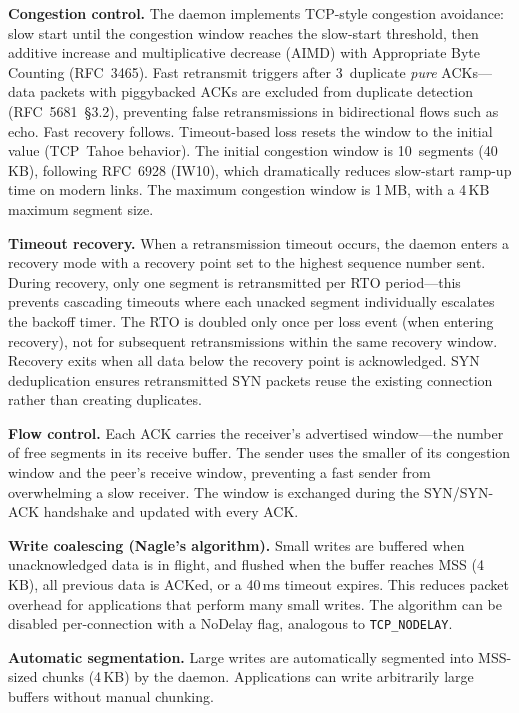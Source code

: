 \documentclass[11pt,a4paper]{article}
\begin{document}
\textbf{Congestion control.} The daemon implements TCP-style congestion avoidance: slow start until the congestion window reaches the slow-start threshold, then additive increase and multiplicative decrease (AIMD) with Appropriate Byte Counting (RFC~3465). Fast retransmit triggers after 3~duplicate \emph{pure} ACKs---data packets with piggybacked ACKs are excluded from duplicate detection (RFC~5681~\S3.2), preventing false retransmissions in bidirectional flows such as echo. Fast recovery follows. Timeout-based loss resets the window to the initial value (TCP~Tahoe behavior). The initial congestion window is 10~segments (40\,KB), following RFC~6928 (IW10), which dramatically reduces slow-start ramp-up time on modern links. The maximum congestion window is 1\,MB, with a 4\,KB maximum segment size.

\textbf{Timeout recovery.} When a retransmission timeout occurs, the daemon enters a recovery mode with a recovery point set to the highest sequence number sent. During recovery, only one segment is retransmitted per RTO period---this prevents cascading timeouts where each unacked segment individually escalates the backoff timer. The RTO is doubled only once per loss event (when entering recovery), not for subsequent retransmissions within the same recovery window. Recovery exits when all data below the recovery point is acknowledged. SYN deduplication ensures retransmitted SYN packets reuse the existing connection rather than creating duplicates.

\textbf{Flow control.} Each ACK carries the receiver's advertised window---the number of free segments in its receive buffer. The sender uses the smaller of its congestion window and the peer's receive window, preventing a fast sender from overwhelming a slow receiver. The window is exchanged during the SYN/SYN-ACK handshake and updated with every ACK.

\textbf{Write coalescing (Nagle's algorithm).} Small writes are buffered when unacknowledged data is in flight, and flushed when the buffer reaches MSS (4\,KB), all previous data is ACKed, or a 40\,ms timeout expires. This reduces packet overhead for applications that perform many small writes. The algorithm can be disabled per-connection with a NoDelay flag, analogous to \texttt{TCP\_NODELAY}.

\textbf{Automatic segmentation.} Large writes are automatically segmented into MSS-sized chunks (4\,KB) by the daemon. Applications can write arbitrarily large buffers without manual chunking.
\end{document}
